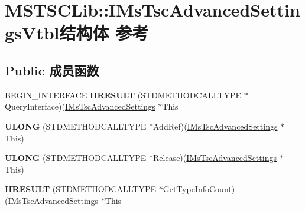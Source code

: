 \hypertarget{struct_m_s_t_s_c_lib_1_1_i_ms_tsc_advanced_settings_vtbl}{}\section{M\+S\+T\+S\+C\+Lib\+:\+:I\+Ms\+Tsc\+Advanced\+Settings\+Vtbl结构体 参考}
\label{struct_m_s_t_s_c_lib_1_1_i_ms_tsc_advanced_settings_vtbl}
\subsection*{Public 成员函数}
\begin{DoxyCompactItemize}
\item 
\mbox{\label{struct_m_s_t_s_c_lib_1_1_i_ms_tsc_advanced_settings_vtbl_ace4e72860e0c64644cd2594d9af84c99}} 
B\+E\+G\+I\+N\+\_\+\+I\+N\+T\+E\+R\+F\+A\+CE {\bfseries H\+R\+E\+S\+U\+LT} (S\+T\+D\+M\+E\+T\+H\+O\+D\+C\+A\+L\+L\+T\+Y\+PE $\ast$Query\+Interface)(\hyperlink{interface_m_s_t_s_c_lib_1_1_i_ms_tsc_advanced_settings}{I\+Ms\+Tsc\+Advanced\+Settings} $\ast$This
\item 
\mbox{\label{struct_m_s_t_s_c_lib_1_1_i_ms_tsc_advanced_settings_vtbl_a070d6ed2324d72175b2dd9fcef08ba97}} 
{\bfseries U\+L\+O\+NG} (S\+T\+D\+M\+E\+T\+H\+O\+D\+C\+A\+L\+L\+T\+Y\+PE $\ast$Add\+Ref)(\hyperlink{interface_m_s_t_s_c_lib_1_1_i_ms_tsc_advanced_settings}{I\+Ms\+Tsc\+Advanced\+Settings} $\ast$This)
\item 
\mbox{\label{struct_m_s_t_s_c_lib_1_1_i_ms_tsc_advanced_settings_vtbl_a5234b31b92ba543dd719377eed4e5031}} 
{\bfseries U\+L\+O\+NG} (S\+T\+D\+M\+E\+T\+H\+O\+D\+C\+A\+L\+L\+T\+Y\+PE $\ast$Release)(\hyperlink{interface_m_s_t_s_c_lib_1_1_i_ms_tsc_advanced_settings}{I\+Ms\+Tsc\+Advanced\+Settings} $\ast$This)
\item 
\mbox{\label{struct_m_s_t_s_c_lib_1_1_i_ms_tsc_advanced_settings_vtbl_afb4b3c5a575b2d59adc5cc45b3920c67}} 
{\bfseries H\+R\+E\+S\+U\+LT} (S\+T\+D\+M\+E\+T\+H\+O\+D\+C\+A\+L\+L\+T\+Y\+PE $\ast$Get\+Type\+Info\+Count)(\hyperlink{interface_m_s_t_s_c_lib_1_1_i_ms_tsc_advanced_settings}{I\+Ms\+Tsc\+Advanced\+Settings} $\ast$This

\end{DoxyCompactItemize}
